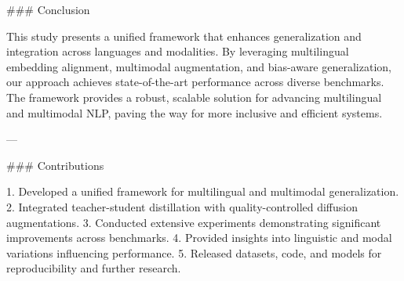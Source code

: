 ### Conclusion

This study presents a unified framework that enhances generalization and integration across languages and modalities. By leveraging multilingual embedding alignment, multimodal augmentation, and bias-aware generalization, our approach achieves state-of-the-art performance across diverse benchmarks. The framework provides a robust, scalable solution for advancing multilingual and multimodal NLP, paving the way for more inclusive and efficient systems.

---

### Contributions

1. Developed a unified framework for multilingual and multimodal generalization.
2. Integrated teacher-student distillation with quality-controlled diffusion augmentations.
3. Conducted extensive experiments demonstrating significant improvements across benchmarks.
4. Provided insights into linguistic and modal variations influencing performance.
5. Released datasets, code, and models for reproducibility and further research.